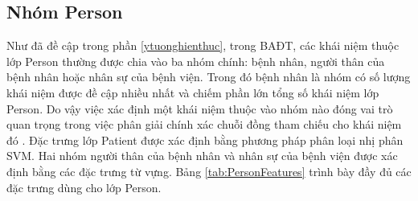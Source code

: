 \subsection*{Nhóm Person}
Như đã đề cập trong phần \ref{ytuonghienthuc}, trong BAĐT, các khái niệm thuộc lớp Person thường được chia vào ba nhóm chính: bệnh nhân, người thân của bệnh nhân hoặc nhân sự của bệnh viện. Trong đó bệnh nhân là nhóm có số lượng khái niệm được đề cập nhiều nhất và chiếm phần lớn tổng số khái niệm lớp Person. Do vậy việc xác định một khái niệm thuộc vào nhóm nào đóng vai trò quan trọng trong việc phân giải chính xác chuỗi đồng tham chiếu cho khái niệm đó \cite{YanXu2012}. Đặc trưng lớp Patient được xác định bằng phương pháp phân loại nhị phân SVM. Hai nhóm người thân của bệnh nhân và nhân sự của bệnh viện được xác định bằng các đặc trưng từ vựng. Bảng \ref{tab:PersonFeatures} trình bày đầy đủ các đặc trưng dùng cho lớp Person.

